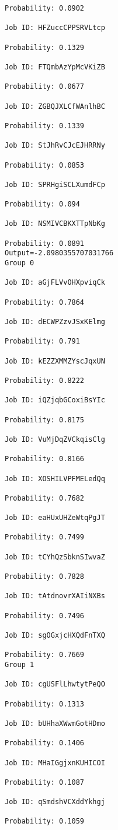 \documentclass[11pt]{article}
\begin{document}
\begin{Verbatim}[commandchars=\\\{\}]
Probability: 0.0902

Job ID: HFZuccCPPSRVLtcp

Probability: 0.1329

Job ID: FTQmbAzYpMcVKiZB

Probability: 0.0677

Job ID: ZGBQJXLCfWAnlhBC

Probability: 0.1339

Job ID: StJhRvCJcEJHRRNy

Probability: 0.0853

Job ID: SPRHgiSCLXumdFCp

Probability: 0.094

Job ID: NSMIVCBKXTTpNbKg

Probability: 0.0891
Output=-2.0980355707031766
Group 0

Job ID: aGjFLVvOHXpviqCk

Probability: 0.7864

Job ID: dECWPZzvJSxKElmg

Probability: 0.791

Job ID: kEZZXMMZYscJqxUN

Probability: 0.8222

Job ID: iQZjqbGCoxiBsYIc

Probability: 0.8175

Job ID: VuMjDqZVCkqisClg

Probability: 0.8166

Job ID: XOSHILVPFMELedQq

Probability: 0.7682

Job ID: eaHUxUHZeWtqPgJT

Probability: 0.7499

Job ID: tCYhQzSbknSIwvaZ

Probability: 0.7828

Job ID: tAtdnovrXAIiNXBs

Probability: 0.7496

Job ID: sgOGxjcHXQdFnTXQ

Probability: 0.7669
Group 1

Job ID: cgUSFlLhwtytPeQO

Probability: 0.1313

Job ID: bUHhaXWwmGotHDmo

Probability: 0.1406

Job ID: MHaIGgjxnKUHICOI

Probability: 0.1087

Job ID: qSmdshVCXddYkhgj

Probability: 0.1059


\end{Verbatim}
\end{document}
